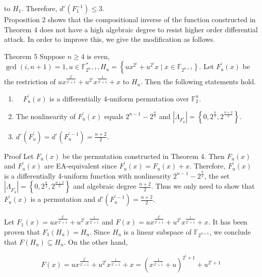 \documentclass[10pt]{article}
\begin{document}
to $H_{1}$. Therefore, $d^{\circ}\left(F_{1}^{-1}\right) \leq 3$.\\
Proposition 2 shows that the compositional inverse of the function constructed in Theorem 4 does not have a high algebraic degree to resist higher order differential attack. In order to improve this, we give the modification as follows.

Theorem 5 Suppose $n \geq 4$ is even, $\operatorname{gcd}(i, n+1)=1, u \in \mathbb{F}_{2^{n+1}}^{*}, H_{u}=\left\{u x^{2^{i}}+u^{2^{i}} x \mid\right. \left.x \in \mathbb{F}_{2^{n+1}}\right\}$. Let $F_{u}^{\prime}(x)$ be the restriction of $u x^{\frac{2^{i}}{2^{i}+1}}+u^{2^{i}} x^{\frac{1}{2^{i}+1}}+x$ to $H_{u}$. Then the following statements hold.

\begin{enumerate}
  \item $\quad F_{u}^{\prime}(x)$ is a differentially 4-uniform permutation over $\mathbb{F}_{2}^{n}$.
  \item The nonlinearity of $F_{u}^{\prime}(x)$ equals $2^{n-1}-2^{\frac{n}{2}}$ and $\left|\Lambda_{F_{u}^{\prime}}\right|=\left\{0,2^{\frac{n}{2}}, 2^{\frac{n+2}{2}}\right\}$.
  \item $d^{\circ}\left(F_{u}^{\prime}\right)=d^{\circ}\left(F_{u}^{\prime-1}\right)=\frac{n+2}{2}$.
\end{enumerate}

Proof Let $F_{u}(x)$ be the permutation constructed in Theorem 4. Then $F_{u}(x)$ and $F_{u}^{\prime}(x)$ are EA-equivalent since $F_{u}^{\prime}(x)=F_{u}(x)+x$. Therefore, $F_{u}^{\prime}(x)$ is a differentially 4-uniform function with nonlinearity $2^{n-1}-2^{\frac{n}{2}}$, the set $\left|\Lambda_{F_{u}^{\prime}}\right|=\left\{0,2^{\frac{n}{2}}, 2^{\frac{n+2}{2}}\right\}$ and algebraic degree $\frac{n+2}{2}$. Thus we only need to show that $F_{u}^{\prime}(x)$ is a permutation and $d^{\circ}\left(F_{u}^{\prime-1}\right)=\frac{n+2}{2}$.

Let $F_{1}(x)=u x^{\frac{2^{i}}{2^{i}+1}}+u^{2^{i}} x^{\frac{1}{2^{i}+1}}$ and $F(x)=u x^{\frac{2^{i}}{2^{i}+1}}+u^{2^{i}} x^{\frac{1}{2^{i}+1}}+x$. It has been proven that $F_{1}\left(H_{u}\right)=H_{u}$. Since $H_{u}$ is a linear subspace of $\mathbb{F}_{2^{n+1}}$, we conclude that $F\left(H_{u}\right) \subseteq H_{u}$. On the other hand,


\begin{equation*}
F(x)=u x^{\frac{2^{i}}{2^{i}+1}}+u^{2^{i}} x^{\frac{1}{2^{i}+1}}+x=\left(x^{\frac{1}{2^{i}+1}}+u\right)^{2^{i}+1}+u^{2^{i}+1} \tag{3}
\end{equation*}
\end{document}
